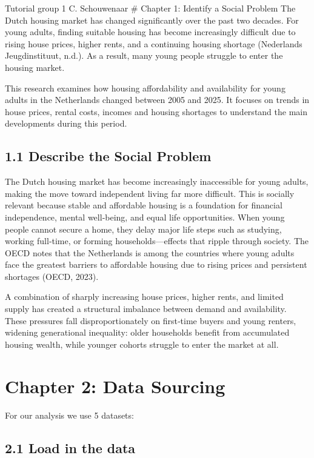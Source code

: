 \documentclass[
]{article}
\begin{document}
Tutorial group 1 C. Schouwenaar \# Chapter 1: Identify a Social Problem
The Dutch housing market has changed significantly over the past two
decades. For young adults, finding suitable housing has become
increasingly difficult due to rising house prices, higher rents, and a
continuing housing shortage (Nederlands Jeugdinstituut, n.d.). As a
result, many young people struggle to enter the housing market.

This research examines how housing affordability and availability for
young adults in the Netherlands changed between 2005 and 2025. It
focuses on trends in house prices, rental costs, incomes and housing
shortages to understand the main developments during this period.

\subsection{1.1 Describe the Social
Problem}\label{describe-the-social-problem}

The Dutch housing market has become increasingly inaccessible for young
adults, making the move toward independent living far more difficult.
This is socially relevant because stable and affordable housing is a
foundation for financial independence, mental well‑being, and equal life
opportunities. When young people cannot secure a home, they delay major
life steps such as studying, working full‑time, or forming
households---effects that ripple through society. The OECD notes that
the Netherlands is among the countries where young adults face the
greatest barriers to affordable housing due to rising prices and
persistent shortages (OECD, 2023).

A combination of sharply increasing house prices, higher rents, and
limited supply has created a structural imbalance between demand and
availability. These pressures fall disproportionately on first‑time
buyers and young renters, widening generational inequality: older
households benefit from accumulated housing wealth, while younger
cohorts struggle to enter the market at all.

\section{Chapter 2: Data Sourcing}\label{chapter-2-data-sourcing}

For our analysis we use 5 datasets:

\subsection{2.1 Load in the data}\label{load-in-the-data}
\end{document}
